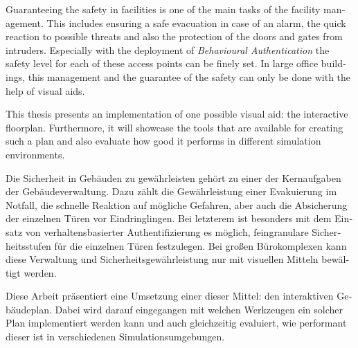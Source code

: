 
\null\vfil
\begin{otherlanguage}{english}
\begin{center}\textsf{\textbf{\abstractname}}\end{center}

\noindent Guaranteeing the safety in facilities is one of the main tasks of the facility management. This includes ensuring a safe evacuation in case of an alarm, the quick reaction to possible threats and also the protection of the doors and gates from intruders. Especially with the deployment of \emph{Behavioural Authentication} the safety level for each of these access points can be finely set. In large office buildings, this management and the guarantee of the safety can only be done with the help of visual aids.

This thesis presents an implementation of one possible visual aid: the interactive floorplan. Furthermore, it will showcase the tools that are available for creating such a plan and also evaluate how good it performs in different simulation environments.

\end{otherlanguage}
\vfil\null



\null\vfil
\begin{otherlanguage}{ngerman}
\begin{center}\textsf{\textbf{\abstractname}}\end{center}

\noindent Die Sicherheit in Gebäuden zu gewährleisten gehört zu einer der Kernaufgaben der Gebäudeverwaltung. Dazu zählt die Gewährleistung einer Evakuierung im Notfall, die schnelle Reaktion auf mögliche Gefahren, aber auch die Absicherung der einzelnen Türen vor Eindringlingen. Bei letzterem ist besonders mit dem Einsatz von verhaltensbasierter Authentifizierung es möglich, feingranulare Sicherheitsstufen für die einzelnen Türen festzulegen. Bei großen Bürokomplexen kann diese Verwaltung und Sicherheitsgewährleistung nur mit visuellen Mitteln bewältigt werden. 

Diese Arbeit präsentiert eine Umsetzung einer dieser Mittel: den interaktiven Gebäudeplan. Dabei wird darauf eingegangen mit welchen Werkzeugen ein solcher Plan implementiert werden kann und auch gleichzeitig evaluiert, wie performant dieser ist in  verschiedenen Simulationsumgebungen.

\end{otherlanguage}
\vfil\null



